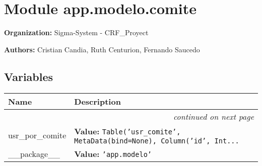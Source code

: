 %
%
%


\section{Module app.modelo.comite}

    \label{app:modelo:comite}
\textbf{Organization:} Sigma-System - CRF\_Proyect



\textbf{Authors:}
Cristian Candia,
    Ruth Centurion,
    Fernando Saucedo



  \subsection{Variables}

    \vspace{-1cm}
\hspace{\varindent}\begin{longtable}{|p{\varnamewidth}|p{\vardescrwidth}|l}
\cline{1-2}
\cline{1-2} \centering \textbf{Name} & \centering \textbf{Description}& \\
\cline{1-2}
\endhead\cline{1-2}\multicolumn{3}{r}{\small\textit{continued on next page}}\\\endfoot\cline{1-2}
\endlastfoot\raggedright u\-s\-r\-\_\-p\-o\-r\-\_\-c\-o\-m\-i\-t\-e\- & \raggedright \textbf{Value:} 
{\tt Table('usr\_comite', MetaData(bind=None), Column('id', Int\texttt{...}}&\\
\cline{1-2}
\raggedright \_\-\_\-p\-a\-c\-k\-a\-g\-e\-\_\-\_\- & \raggedright \textbf{Value:} 
{\tt \texttt{'}\texttt{app.modelo}\texttt{'}}&\\
\cline{1-2}
\end{longtable}



